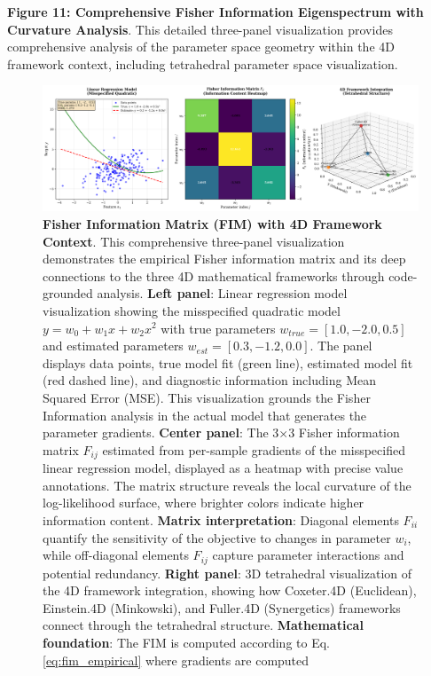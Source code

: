 \documentclass[
  10pt,
]{article}
\begin{document}
\textbf{Figure 11: Comprehensive Fisher Information Eigenspectrum with
Curvature Analysis}. This detailed three-panel visualization provides
comprehensive analysis of the parameter space geometry within the 4D
framework context, including tetrahedral parameter space visualization.

\begin{figure}
\centering
\includegraphics{../output/figures/fisher_information_matrix.png}
\caption{\textbf{Fisher Information Matrix (FIM) with 4D Framework
Context}. This comprehensive three-panel visualization demonstrates the
empirical Fisher information matrix and its deep connections to the
three 4D mathematical frameworks through code-grounded analysis.
\textbf{Left panel}: Linear regression model visualization showing the
misspecified quadratic model \(y = w_0 + w_1 x + w_2 x^2\) with true
parameters \(w_{true} = [1.0, -2.0, 0.5]\) and estimated parameters
\(w_{est} = [0.3, -1.2, 0.0]\). The panel displays data points, true
model fit (green line), estimated model fit (red dashed line), and
diagnostic information including Mean Squared Error (MSE). This
visualization grounds the Fisher Information analysis in the actual
model that generates the parameter gradients. \textbf{Center panel}: The
3×3 Fisher information matrix \(F_{ij}\) estimated from per-sample
gradients of the misspecified linear regression model, displayed as a
heatmap with precise value annotations. The matrix structure reveals the
local curvature of the log-likelihood surface, where brighter colors
indicate higher information content. \textbf{Matrix interpretation}:
Diagonal elements \(F_{ii}\) quantify the sensitivity of the objective
to changes in parameter \(w_i\), while off-diagonal elements \(F_{ij}\)
capture parameter interactions and potential redundancy. \textbf{Right
panel}: 3D tetrahedral visualization of the 4D framework integration,
showing how Coxeter.4D (Euclidean), Einstein.4D (Minkowski), and
Fuller.4D (Synergetics) frameworks connect through the tetrahedral
structure. \textbf{Mathematical foundation}: The FIM is computed
according to Eq. \eqref{eq:fim_empirical} where gradients are computed
}
\end{figure}
\end{document}
